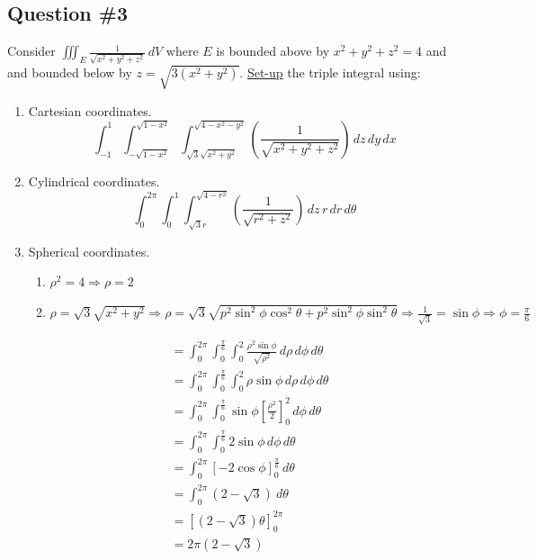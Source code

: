 \documentclass[letter,11pt]{article}
\begin{document}
\subsection{Question \#3}
Consider $\displaystyle \iiint_{E} \frac{1}{\sqrt{x^2+y^2+z^2}} \, dV$ where $E$ is bounded above by $x^2+y^2+z^2=4$ and and bounded below
by $z=\sqrt{3(x^2+y^2)}$. \underline{Set-up} the triple integral using:
\begin{enumerate}[label = \roman*.]
    \item Cartesian coordinates.
    $$\boxed{\int_{-1}^{1}\int_{-\sqrt{1-x^{2}}}^{\sqrt{1-x^{2}}}\int_{\sqrt{3}\sqrt{x^{2}+y^{2}}}^{\sqrt{4-x^{2}-y^{2}}}\left(\frac{1}{\sqrt{x^{2}+y^{2}+z^{2}}}\right) \, dz \, dy\, dx}$$
    \item Cylindrical coordinates.
    $$\boxed{\int_{0}^{2\pi}\int_{0}^{1}\int_{\sqrt{3}r}^{\sqrt{4-r^{2}}}\left(\frac{1}{\sqrt{r^{2}+z^{2}}}\right) \,dz\, r\, dr\, d\theta}$$
    \item Spherical coordinates. 
    \begin{enumerate}
        \item $\rho^2 = 4 \Longrightarrow \rho = 2$
        \item $\rho= \sqrt{3} \sqrt{x^2+y^2} \Longrightarrow \rho= \sqrt{3} \sqrt{p^2\sin^2\phi\cos^2\theta+p^2\sin^2\phi\sin^2\theta} \Longrightarrow \frac{1}{\sqrt{3}} = \sin\phi \Longrightarrow \phi = \frac{\pi}{6}$
    \end{enumerate}
    \begin{align*}
		&= \int_{0}^{2\pi}\int_{0}^{\frac{\pi}{6}}\int_{0}^{2} \frac{\rho^2\sin\phi}{\sqrt{\rho^2}} \, d\rho\, d\phi\, d\theta\\
        &= \int_{0}^{2\pi}\int_{0}^{\frac{\pi}{6}}\int_{0}^{2}\rho \sin\phi \, d\rho\, d\phi\, d\theta\\
        &= \int_{0}^{2\pi}\int_{0}^{\frac{\pi}{6}}\sin\phi \left[\frac{\rho^2}{2}\right]_{0}^{2}\, d\phi\, d\theta\\
        &= \int_{0}^{2\pi}\int_{0}^{\frac{\pi}{6}}2\sin\phi \,  d\phi\, d\theta\\
        &= \int_{0}^{2\pi}\left[-2\cos\phi\right]_{0}^{\frac{\pi}{6}}\, d\theta\\
        &= \int_{0}^{2\pi}\left(2-\sqrt{3}\right)\ d\theta\\
        &= \left[\left(2 - \sqrt{3}\right)\theta \right]_{0}^{2\pi}\\
        &= \boxed{2\pi\left(2 - \sqrt{3}\right)}
        \end{align*}
\end{enumerate}
\newpage
\end{document}
